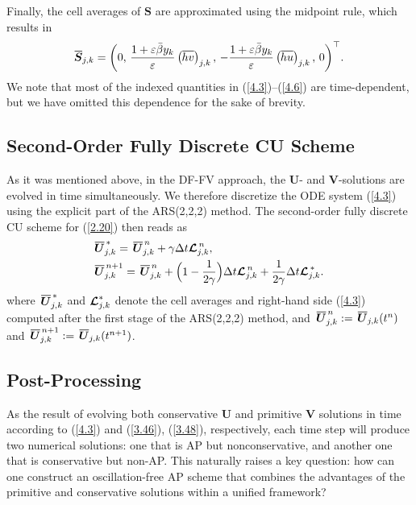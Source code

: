 \documentclass[a4paper,11pt,twoside]{article}
\numberwithin{equation}{section}
\numberwithin{figure}{section}
\numberwithin{table}{section}
\newcommand{\eps}{\varepsilon}
\newcommand{\dt}{\Delta t}
\newcommand{\bU}{\bm{U}}
\newcommand{\bV}{\bm{V}}
\newcommand{\bS}{\bm{S}}
\newcommand\eref[1]{(\ref{#1})}
\newcommand*\xbar[1]{%
	\hbox{%
		\vbox{%
			\hrule height 0.5pt %
			\kern0.3ex%
			\hbox{%
				\kern-0.05em%
				\ensuremath{#1}%
				\kern-0.02em%
			}%
		}%
	}%
}
\begin{document}
Finally, the cell averages of $\bS$ are approximated using the midpoint rule, which results in
\begin{equation}
\xbar{\bS}_{j,k}=\bigg(0,\,\frac{1+\eps\bar{\beta}y_k}{\eps}\left(\xbar{hv}\right)_{j,k},\,
-\frac{1+\eps\bar{\beta}y_k}{\eps}\left(\xbar{hu}\right)_{j,k},\,0\bigg)^\top.
\label{4.6}
\end{equation}
We note that most of the indexed quantities in \eref{4.3}--\eref{4.6} are time-dependent, but we have omitted this dependence for the sake 
of brevity.
	
\subsection{Second-Order Fully Discrete CU Scheme}
As it was mentioned above, in the DF-FV approach, the $\bU$- and $\bV$-solutions are evolved in time simultaneously. We therefore discretize
the ODE system \eref{4.3} using the explicit part of the ARS(2,2,2) method. The second-order fully discrete CU scheme for \eref{2.20} then
reads as
\begin{equation*}
\begin{aligned}
&\xbar{\bU}^{\,*}_{j,k}=\,\xbar{\bU}_{j,k}^{\,n}+\gamma\dt\bm{{\cal L}}_{j,k}^{\,n},\\
&\xbar{\bU}_{j,k}^{\,n+1}=\,\xbar{\bU}_{j,k}^{\,n}+\Big(1-\frac{1}{2\gamma}\Big)\dt\bm{{\cal L}}_{j,k}^{\,n}+
\frac{1}{2\gamma}\dt\bm{{\cal L}}_{j,k}^{\,*}.
\end{aligned}
\end{equation*}
where $\,\xbar{\bU}^{\,*}_{j,k}$ and $\bm{{\cal L}}_{j,k}^*$ denote the cell averages and right-hand side \eref{4.3} computed after the 
first stage of the ARS(2,2,2) method, and $\,\xbar{\bU}^{\,n}_{j,k}:=\,\xbar{\bU}_{j,k}(t^n)$ and
$\,\xbar{\bU}^{\,n+1}_{j,k}:=\,\xbar{\bU}_{j,k}(t^{n+1})$.

\subsection{Post-Processing}\label{sec43}
As the result of evolving both conservative $\bm U$ and primitive $\bm V$ solutions in time according to \eref{4.3} and \eref{3.46},
\eref{3.48}, respectively, each time step will produce two numerical solutions: one that is AP but nonconservative, and another one that is 
conservative but non-AP. This naturally raises a key question: how can one construct an oscillation-free AP scheme that combines the
advantages of the primitive and conservative solutions within a unified framework? 
\end{document}
